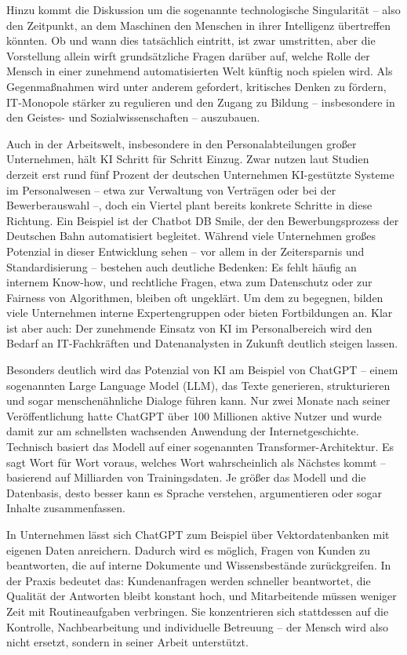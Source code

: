 \documentclass[utf8,biblatex]{bremerhaven_lni}
\begin{document}
Hinzu kommt die Diskussion um die sogenannte technologische Singularität – also den Zeitpunkt, an dem Maschinen den Menschen in ihrer Intelligenz übertreffen könnten. Ob und wann dies tatsächlich eintritt, ist zwar umstritten, aber die Vorstellung allein wirft grundsätzliche Fragen darüber auf, welche Rolle der Mensch in einer zunehmend automatisierten Welt künftig noch spielen wird. Als Gegenmaßnahmen wird unter anderem gefordert, kritisches Denken zu fördern, IT-Monopole stärker zu regulieren und den Zugang zu Bildung – insbesondere in den Geistes- und Sozialwissenschaften – auszubauen.

Auch in der Arbeitswelt, insbesondere in den Personalabteilungen großer Unternehmen, hält KI Schritt für Schritt Einzug. Zwar nutzen laut Studien derzeit erst rund fünf Prozent der deutschen Unternehmen KI-gestützte Systeme im Personalwesen – etwa zur Verwaltung von Verträgen oder bei der Bewerberauswahl –, doch ein Viertel plant bereits konkrete Schritte in diese Richtung. Ein Beispiel ist der Chatbot DB Smile, der den Bewerbungsprozess der Deutschen Bahn automatisiert begleitet. Während viele Unternehmen großes Potenzial in dieser Entwicklung sehen – vor allem in der Zeitersparnis und Standardisierung – bestehen auch deutliche Bedenken: Es fehlt häufig an internem Know-how, und rechtliche Fragen, etwa zum Datenschutz oder zur Fairness von Algorithmen, bleiben oft ungeklärt. Um dem zu begegnen, bilden viele Unternehmen interne Expertengruppen oder bieten Fortbildungen an. Klar ist aber auch: Der zunehmende Einsatz von KI im Personalbereich wird den Bedarf an IT-Fachkräften und Datenanalysten in Zukunft deutlich steigen lassen.

Besonders deutlich wird das Potenzial von KI am Beispiel von ChatGPT – einem sogenannten Large Language Model (LLM), das Texte generieren, strukturieren und sogar menschenähnliche Dialoge führen kann. Nur zwei Monate nach seiner Veröffentlichung hatte ChatGPT über 100 Millionen aktive Nutzer und wurde damit zur am schnellsten wachsenden Anwendung der Internetgeschichte. Technisch basiert das Modell auf einer sogenannten Transformer-Architektur. Es sagt Wort für Wort voraus, welches Wort wahrscheinlich als Nächstes kommt – basierend auf Milliarden von Trainingsdaten. Je größer das Modell und die Datenbasis, desto besser kann es Sprache verstehen, argumentieren oder sogar Inhalte zusammenfassen.

In Unternehmen lässt sich ChatGPT zum Beispiel über Vektordatenbanken mit eigenen Daten anreichern. Dadurch wird es möglich, Fragen von Kunden zu beantworten, die auf interne Dokumente und Wissensbestände zurückgreifen. In der Praxis bedeutet das: Kundenanfragen werden schneller beantwortet, die Qualität der Antworten bleibt konstant hoch, und Mitarbeitende müssen weniger Zeit mit Routineaufgaben verbringen. Sie konzentrieren sich stattdessen auf die Kontrolle, Nachbearbeitung und individuelle Betreuung – der Mensch wird also nicht ersetzt, sondern in seiner Arbeit unterstützt.
\end{document}
